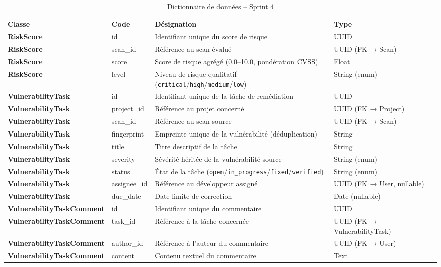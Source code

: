 \begin{table}[H]
\centering
\caption{Dictionnaire de données -- Sprint 4}
\label{tab:dict-sprint4}
\small
\renewcommand{\arraystretch}{1.3}
\begin{tabularx}{\textwidth}{>{\bfseries}p{2.8cm} p{3.2cm} X p{2.5cm}}
\hline
\rowcolor{gray!15}
\textbf{Classe} & \textbf{Code} & \textbf{Désignation} & \textbf{Type} \\
\hline
RiskScore & id & Identifiant unique du score de risque & UUID \\
RiskScore & scan\_id & Référence au scan évalué & UUID (FK → Scan) \\
RiskScore & score & Score de risque agrégé (0.0--10.0, pondération CVSS) & Float \\
RiskScore & level & Niveau de risque qualitatif (\texttt{critical}/\texttt{high}/\texttt{medium}/\texttt{low}) & String (enum) \\
\hline
VulnerabilityTask & id & Identifiant unique de la tâche de remédiation & UUID \\
VulnerabilityTask & project\_id & Référence au projet concerné & UUID (FK → Project) \\
VulnerabilityTask & scan\_id & Référence au scan source & UUID (FK → Scan) \\
VulnerabilityTask & fingerprint & Empreinte unique de la vulnérabilité (déduplication) & String \\
VulnerabilityTask & title & Titre descriptif de la tâche & String \\
VulnerabilityTask & severity & Sévérité héritée de la vulnérabilité source & String (enum) \\
VulnerabilityTask & status & État de la tâche (\texttt{open}/\texttt{in\_progress}/\texttt{fixed}/\texttt{verified}) & String (enum) \\
VulnerabilityTask & assignee\_id & Référence au développeur assigné & UUID (FK → User, nullable) \\
VulnerabilityTask & due\_date & Date limite de correction & Date (nullable) \\
\hline
VulnerabilityTaskComment & id & Identifiant unique du commentaire & UUID \\
VulnerabilityTaskComment & task\_id & Référence à la tâche concernée & UUID (FK → VulnerabilityTask) \\
VulnerabilityTaskComment & author\_id & Référence à l'auteur du commentaire & UUID (FK → User) \\
VulnerabilityTaskComment & content & Contenu textuel du commentaire & Text \\

\end{tabularx}
\end{table}
